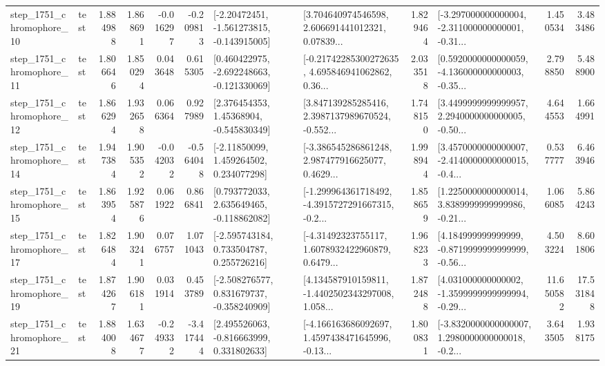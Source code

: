 \begin{tabular}{llrrrrllrlrr}
 step\_1751\_chromophore\_10 &      test &      1.884988 &    1.868691 &     -0.016297 & -0.209813 &   [-2.20472451, -1.561273815, -0.143915005] &  [3.704640974546598, 2.606691441012321, 0.07839... &       1.829464 &  [-3.297000000000004, -2.311000000000001, -0.31... &            1.450534 &          3.483486 \\
 step\_1751\_chromophore\_11 &      test &      1.806646 &    1.850294 &      0.043648 &  0.615305 &   [0.460422975, -2.692248663, -0.121330069] &  [-0.21742285300272635, 4.695846941062862, 0.36... &       2.033518 &  [0.5920000000000059, -4.136000000000003, -0.35... &            2.798850 &          5.488900 \\
 step\_1751\_chromophore\_12 &      test &      1.866294 &    1.932658 &      0.066364 &  0.927989 &     [2.376454353, 1.45368904, -0.545830349] &  [3.847139285285416, 2.3987137989670524, -0.552... &       1.748150 &  [3.4499999999999957, 2.2940000000000005, -0.50... &            4.644553 &          1.664991 \\
 step\_1751\_chromophore\_14 &      test &      1.947384 &    1.905352 &     -0.042032 & -0.564048 &     [-2.11850099, 1.459264502, 0.234077298] &  [-3.386545286861248, 2.987477916625077, 0.4629... &       1.998944 &  [3.4570000000000007, -2.4140000000000015, -0.4... &            0.537777 &          6.463946 \\
 step\_1751\_chromophore\_15 &      test &      1.863954 &    1.925876 &      0.061922 &  0.866841 &    [0.793772033, 2.635649465, -0.118862082] &  [-1.299964361718492, -4.3915727291667315, -0.2... &       1.858659 &  [1.2250000000000014, 3.8389999999999986, -0.21... &            1.066085 &          5.864243 \\
 step\_1751\_chromophore\_17 &      test &      1.826484 &    1.903241 &      0.076757 &  1.071043 &    [-2.595743184, 0.733504787, 0.255726216] &  [-4.31492323755117, 1.6078932422960879, 0.6479... &       1.968233 &  [4.184999999999999, -0.8719999999999999, -0.56... &            4.503224 &          8.601806 \\
 step\_1751\_chromophore\_19 &      test &      1.874267 &    1.906181 &      0.031914 &  0.453789 &   [-2.508276577, 0.831679737, -0.358240909] &  [4.134587910159811, -1.4402502343297008, 1.058... &       1.872488 &  [4.031000000000002, -1.3599999999999994, -0.29... &           11.650582 &         17.531848 \\
 step\_1751\_chromophore\_21 &      test &      1.884008 &    1.634677 &     -0.249332 & -3.417444 &    [2.495526063, -0.816663999, 0.331802633] &  [-4.166163686092697, 1.4597438471645996, -0.13... &       1.800831 &  [-3.8320000000000007, 1.2980000000000018, -0.2... &            3.643505 &          1.938175 \\

\end{tabular}
